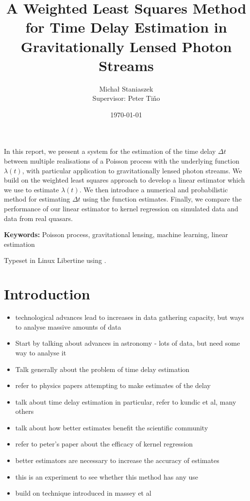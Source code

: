 \documentclass[a4paper,11pt]{article}
\title{A Weighted Least Squares Method for Time Delay Estimation in Gravitationally Lensed Photon Streams}
\author{\Large{Micha{\l} Staniaszek} \\\small{Supervisor: Peter Tiňo}}
\date{\today}
\begin{document}
\maketitle


\thispagestyle{empty}
\newpage
{}
In this report, we present a system for the estimation of the
time delay $\Delta t$ between multiple realisations of a Poisson
process with the underlying function $\lambda(t)$, with particular
application to gravitationally lensed photon streams. We build on
the weighted least squares approach to develop a linear estimator 
which we use to estimate $\lambda(t)$. We then introduce a numerical
and probabilistic method for estimating $\Delta t$ using
the function estimates. Finally, we compare the performance of our
linear estimator to kernel regression on simulated data and data 
from real quasars.

\vspace{1.0cm}\textbf{Keywords: }Poisson process, gravitational lensing,
 machine learning, linear estimation

\begin{center}
\vspace*{\fill}\scriptsize{Typeset in Linux Libertine using \XeTeX}.
\end{center}
\newpage
\tableofcontents
\newpage
{}
\section{Introduction}
\label{sec-1}

\begin{itemize}
\item technological advances lead to increases in data gathering capacity, but ways to analyse massive amounts of data \cite{starck2002handbook}
\item Start by talking about advances in astronomy - lots of data, but need some way to analyse it
\item Talk generally about the problem of time delay estimation
\item refer to physics papers attempting to make estimates of the delay
\item talk about time delay estimation in particular, refer to kundic et al, many others
\item talk about how better estimates benefit the scientific community
\item refer to peter's paper about the efficacy of kernel regression
\item better estimators are necessary to increase the accuracy of estimates
\item this is an experiment to see whether this method has any use
\item build on technique introduced in massey et al
\end{itemize}
\end{document}
